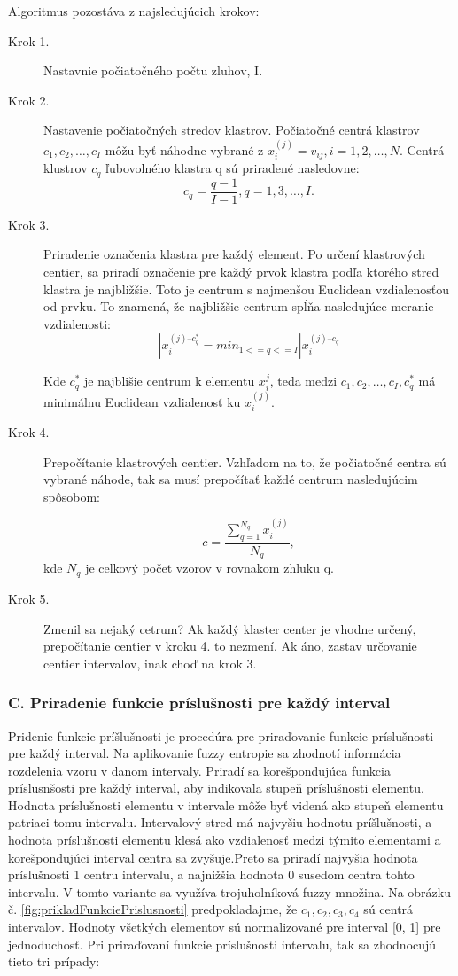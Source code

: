 Algoritmus pozostáva z najsledujúcich krokov: 
\begin{description}
\item[Krok 1.] Nastavnie počiatočného počtu zluhov, I. 
\item[Krok 2.] Nastavenie počiatočných stredov klastrov. 
Počiatočné centrá klastrov $c_1, c_2, \ldots, c_I$ môžu byť náhodne vybrané z $x_i^(j) = v_{ij}, i=1, 2, \ldots, N.$ Centrá klustrov $c_q$ ľubovolného klastra q sú priradené nasledovne: 
$$ c_q = \frac{q-1}{I-1}, q = 1, 3, \ldots, I.  $$
\item[Krok 3.] Priradenie označenia klastra pre každý element. 
Po určení klastrových centier,  sa priradí označenie pre každý prvok klastra podľa ktorého stred klastra je najbližšie. Toto je centrum s najmenšou Euclidean vzdialenosťou od prvku. To znamená, že najbližšie centrum spĺňa nasledujúce meranie vzdialenosti: 
$$|{x_i^{(j) – c_q^*}} = min_{1<=q <=I} |{x_i^{(j) – c_q}} $$

Kde $c_q^*$ je najblišie centrum k elementu $x_i^{j}$, teda medzi $c_1, c_2, \ldots,  c_I, c_q^*$ má minimálnu Euclidean vzdialenosť ku $x_i^{(j)}$.

\item[Krok 4.]Prepočítanie klastrových centier. 
Vzhľadom na to, že počiatočné centra sú vybrané náhode, tak sa musí prepočítať  každé centrum nasledujúcim spôsobom: 

 $$c=\frac{\sum\limits_{q=1}^{N_q} x_i^{(j)} }{N_q}, $$
kde $N_q$ je celkový počet vzorov v rovnakom zhluku q. 

\item[Krok 5.] Zmenil sa nejaký cetrum? 
Ak každý klaster center je vhodne určený, prepočítanie centier v kroku 4. to nezmení. Ak áno, zastav určovanie centier intervalov, inak choď na krok 3. 
\end{description}


\subsubsection{C. Priradenie funkcie príslušnosti pre každý interval}

Pridenie funkcie príšlušnosti je procedúra pre priraďovanie funkcie príslušnosti pre každý interval. Na aplikovanie fuzzy entropie sa zhodnotí informácia rozdelenia vzoru v danom intervaly. Priradí sa korešpondujúca funkcia príslusnšosti pre každý interval, aby indikovala stupeň príslušnosti elementu. Hodnota príslušnosti elementu v intervale môže byť videná ako stupeň elementu patriaci tomu intervalu. Intervalový stred má najvyšiu hodnotu príšlušnosti, a hodnota príslušnosti elementu klesá ako vzdialenosť medzi týmito elementami a korešpondujúci interval centra sa zvyšuje.Preto sa priradí najvyšia hodnota príslušnosti 1 centru intervalu, a najnižšia hodnota 0 susedom centra tohto intervalu. V tomto variante sa využíva trojuholníková fuzzy množina. Na obrázku č. \ref{fig:prikladFunkciePrislusnosti} predpokladajme, že $c_1, c_2, c_3, c_4$ sú centrá intervalov. Hodnoty všetkých elementov sú normalizované pre interval [0, 1] pre jednoduchosť. 
Pri priraďovaní funkcie príslušnosti intervalu, tak sa zhodnocujú tieto tri prípady: 

